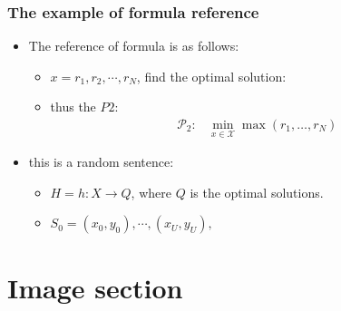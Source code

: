 \documentclass{../../../Cls/SDU/Beamer/Beamer}
\begin{document}
\begin{frame}
    \frametitle{The example of formula reference} %
    \begin{itemize}
        \item The reference of formula is as follows:
              \begin{itemize}
                  \item $x={r_1,r_2,\cdots,r_N}$, find the optimal solution:
                  \item thus the $P2$:
                        \begin{align*} %
                            \mathcal {P}_2: & \min \limits _{x \in \mathcal {X}} \max ({r_1, \ldots, r_N}) \tag{8} %
                        \end{align*}
              \end{itemize}
        \item this is a random sentence:
              \begin{itemize}
                  \item $H={h:X→Q}$, where $Q$ is the optimal solutions.
                  \item $S_0={(x_0,y_0),\cdots,(x_U,y_U)},$
              \end{itemize}
    \end{itemize}
\end{frame}

\section{Image section} %
\end{document}
